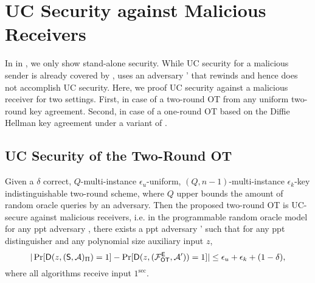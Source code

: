 \section{UC Security against Malicious Receivers}\label{sec:UCOT}

In  in , we only show stand-alone security. While UC security for a malicious sender is already covered by , 
 uses an adversary \Adv' that rewinds \Adv and hence does not accomplish UC security. Here, we proof UC security against a malicious receiver for two settings. First, in case of a two-round OT from any uniform two-round key agreement. Second, in case of a one-round OT based on the Diffie Hellman key agreement under a variant of \DDH.  


\subsection{UC Security of the Two-Round OT}
 
\begin{claim}\label{claim:UCmalreceiver}
Given a $\delta$ correct,  $Q$-multi-instance $\epsilon_u$-uniform,  $(Q,n-1)$-multi-instance $\epsilon_k$-key indistinguishable two-round \UKA scheme, where $Q$ upper bounds the amount of random oracle queries by an adversary. Then the proposed two-round OT is UC-secure against malicious receivers, i.e. in the programmable random oracle model for any ppt adversary \Adv, there exists a ppt adversary \Adv' such that for any ppt distinguisher \D and any polynomial size auxiliary input $z$,
$$
|\Pr[\mathsf D(z,(\mathsf{S}, \mathcal{A})_{\Pi})=1] -\Pr[\mathsf D(z,(\mathcal{F}_{\mathsf{OT}}^\mathsf{E},\mathcal{A}'))=1]|\leq \epsilon_{u}+\epsilon_{k}+(1-\delta),
$$
where all algorithms receive input $1^\sec$.
\end{claim}


